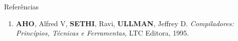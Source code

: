 \begin{frame}[fragile]{Referências}

    \begin{enumerate}
        \item \textbf{AHO}, Alfred V, \textbf{SETHI}, Ravi, \textbf{ULLMAN}, Jeffrey D. \textit{Compiladores: Princípios, Técnicas e Ferramentas}, LTC Editora, 1995.
    \end{enumerate}

\end{frame}

